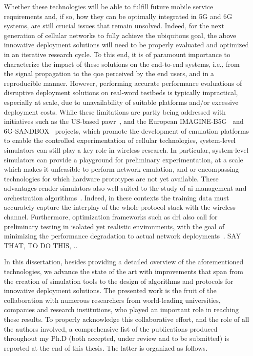 Whether these technologies will be able to fulfill future mobile service requirements and, if so, how they can be optimally integrated in 5G and 6G systems, are still crucial issues that remain unsolved. 
Indeed, for the next generation of cellular networks to fully achieve the ubiquitous goal, the above innovative deployment solutions will need to be properly evaluated and optimized in an iterative research cycle. To this end, it is of paramount importance to characterize the impact of these solutions on the end-to-end systems, i.e., from the signal propagation to the \gls{qoe} perceived by the end users, and in a reproducible manner.
However, performing accurate performance evaluations of disruptive deployment solutions on real-word testbeds is typically impractical, especially at scale, due to unavailability of suitable platforms and/or excessive deployment costs.
While these limitations are partly being addressed with initiatives such as the US-based \gls{pawr}~\cite{BONATI2023109502}, and the European IMAGINE-B5G~\cite{10597052} and 6G-SANDBOX~\cite{10597112} projects, which promote the development of emulation platforms to enable the controlled experimentation of cellular technologies, system-level simulators can still play a key role in wireless research.
In particular, system-level simulators can provide a playground for preliminary experimentation, at a scale which makes it unfeasible to perform network emulation, and or encompassing technologies for which hardware prototypes are not yet available. 
These advantages render simulators also well-suited to the study of \gls{ai} management and orchestration algorithms~\cite{polese2022colo}.
Indeed, in these contexts the training data must accurately capture the interplay of the whole protocol stack with the wireless channel. Furthermore, optimization frameworks such as \gls{drl} also call for preliminary testing in isolated yet realistic environments, with the goal of minimizing the performance degradation to actual network deployments~\cite{lacava2022programmable, amir2023safehaul}.
SAY THAT, TO DO THIS, ..

In this dissertation, besides providing a detailed overview of the aforementioned technologies, we advance the state of the art with improvements that span from the creation of simulation tools to the design of algorithms and protocols for innovative deployment solutions.
The presented work is the fruit of the collaboration with numerous researchers from world-leading universities, companies and research institutions, who played an important role in reaching these results. To properly acknowledge this collaborative effort, and the role of all the
authors involved, a comprehensive list of the publications produced throughout my Ph.D (both accepted, under review and to be submitted) is reported at the end of this thesis. The latter is organized as follows.

